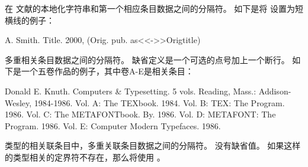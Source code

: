 \begin{ltxsyntax}
\begin{ltxexample}
\mkbibnamelast
\mkbibnamefirst
\mkbibnameaffix
\end{ltxexample}

在  文献的本地化字符串和第一个相应条目数据之间的分隔符。
如下是将  设置为短横线的例子：

\begin{ltxexample}
A. Smith. Title. 2000, (Orig. pub. as<<->>Origtitle)
\end{ltxexample}

多重相关条目数据之间的分隔符。
缺省定义是一个可选的点号加上一个断行。
如下是一个五卷作品的例子，其中卷A-E是相关条目：

\begin{ltxexample}
Donald E. Knuth. Computers & Typesetting. 5 vols. Reading, Mass.: Addison-
Wesley, 1984-1986.
Vol. A: The TEXbook. 1984.
Vol. B: TEX: The Program. 1986.
Vol. C: The METAFONTbook. By. 1986.
Vol. D: METAFONT: The Program. 1986.
Vol. E: Computer Modern Typefaces. 1986.
\end{ltxexample}

 类型的相关联条目中，多重关联条目数据之间的分隔符。
没有缺省值。
如果这样的类型相关的定界符不存在，那么将使用 。

\end{ltxsyntax}

